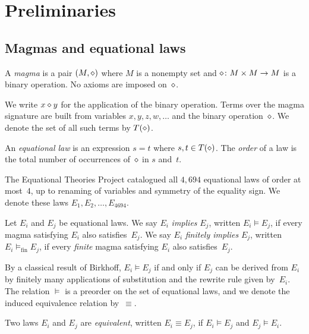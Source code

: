 \section{Preliminaries}\label{sec:prelim}

\subsection{Magmas and equational laws}

\begin{definition}\label{def:magma}
A \emph{magma} is a pair $(M, \diamond)$ where $M$ is a nonempty set and
$\diamond \colon M \times M \to M$ is a binary operation.  No axioms are imposed on~$\diamond$.
\end{definition}

We write $x \diamond y$ for the application of the binary operation.  Terms over the
magma signature are built from variables $x, y, z, w, \ldots$ and the binary
operation~$\diamond$.  We denote the set of all such terms by $T(\diamond)$.

\begin{definition}\label{def:eqlaw}
An \emph{equational law} is an expression $s = t$ where $s, t \in T(\diamond)$.
The \emph{order} of a law is the total number of occurrences of~$\diamond$ in $s$
and~$t$.
\end{definition}

The Equational Theories Project \cite{ETP2025} catalogued all $4{,}694$
equational laws of order at most~$4$, up to renaming of variables and symmetry
of the equality sign.  We denote these laws $E_1, E_2, \ldots, E_{4694}$.

\begin{definition}\label{def:implication}
Let $E_i$ and $E_j$ be equational laws.  We say $E_i$ \emph{implies} $E_j$,
written $E_i \models E_j$, if every magma satisfying $E_i$ also
satisfies~$E_j$.  We say $E_i$ \emph{finitely implies} $E_j$, written
$E_i \models_{\mathrm{fin}} E_j$, if every \emph{finite} magma satisfying $E_i$
also satisfies~$E_j$.
\end{definition}

By a classical result of Birkhoff, $E_i \models E_j$ if and only if $E_j$ can
be derived from $E_i$ by finitely many applications of substitution and the
rewrite rule given by~$E_i$.  The relation $\models$ is a preorder on the set of
equational laws, and we denote the induced equivalence relation by~$\equiv$.

\begin{definition}\label{def:equiv-class}
Two laws $E_i$ and $E_j$ are \emph{equivalent}, written $E_i \equiv E_j$, if
$E_i \models E_j$ and $E_j \models E_i$.
\end{definition}

